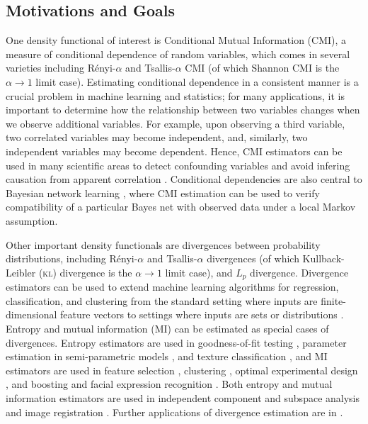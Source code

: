 \documentclass{article} %
\newcommand{\acro}[1]{\textsc{\MakeLowercase{#1}}}
\begin{document}
\subsection{Motivations and Goals}
One density functional of interest is Conditional Mutual Information (CMI), a
measure of conditional dependence of random variables, which comes in several
varieties including R\'enyi-$\alpha$ and Tsallis-$\alpha$ CMI (of which Shannon
CMI is the $\alpha \to 1$ limit case). Estimating conditional dependence in a
consistent manner is a crucial problem in machine learning and statistics; for
many applications, it is important to determine how the relationship between
two variables changes when we observe additional variables. For example, upon
observing a third variable, two correlated variables may become independent,
and, similarly, two independent variables may become dependent. Hence, CMI
estimators can be used in many scientific areas to detect confounding variables
and avoid infering causation from apparent correlation
\citep{pearl98counfounding,montgomery05experiments}. Conditional dependencies
are also central to Bayesian network learning
\citep{koller09probgraphmodels,zhang11independencetest}, where CMI estimation
can be used to verify compatibility of a particular Bayes net with observed
data under a local Markov assumption.

Other important density functionals are divergences between probability
distributions, including R\'enyi-$\alpha$ \citep{renyi70probability} and
Tsallis-$\alpha$ \cite{villmann10mathematical} divergences (of which
Kullback-Leibler (\acro{KL}) divergence \citep{kullback51KL} is the
$\alpha \to 1$ limit case), and $L_p$ divergence. Divergence estimators can be
used to extend machine learning algorithms for regression, classification, and
clustering from the standard setting where inputs are finite-dimensional
feature vectors to settings where inputs are sets or distributions
\citep{poczos12kernelimages,oliva13ICML}.
Entropy and mutual information (MI) can be estimated as special cases of
divergences. Entropy estimators are used in goodness-of-fit testing
\citep{goria05new},
parameter estimation in semi-parametric models \citep{Wolsztynski85minimum},
and texture classification \citep{hero2002aes}, and MI estimators are used in
feature selection \citep{peng05feature}, clustering
\citep{aghagolzadeh07hierarchical},
optimal experimental design \citep{lewi07realtime}, and boosting and facial
expression recognition \citep{Shan05conditionalmutual}. Both entropy and mutual
information estimators are used in independent component and subspace analysis
\citep{radical03,szabo07undercomplete_TCC} and image registration
\citep{hero2002aes}. Further applications of divergence estimation are in
\citep{Leonenko-Pronzato-Savani2008}.
\end{document}
